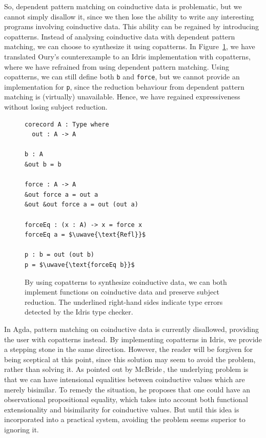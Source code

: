So, dependent pattern matching on coinductive data is problematic, but we cannot
simply disallow it, since we then lose the ability to write any interesting
programs involving coinductive data. This ability can be regained by introducing
copatterns. Instead of analysing coinductive data with dependent pattern
matching, we can choose to synthesize it using copatterns. In
Figure~\ref{fig:ourys_counterexample_copatterns}, we have translated Oury's
counterexample to an Idris implementation with copatterns, where we have
refrained from using dependent pattern matching. Using copatterns, we can still
define both \texttt{b} and \texttt{force}, but we cannot provide an
implementation for \texttt{p}, since the reduction behaviour from dependent
pattern matching is (virtually) unavailable. Hence, we have regained
expressiveness without losing subject reduction.

\begin{figure}[h]
\begin{lstlisting}[mathescape]
corecord A : Type where
  out : A -> A

b : A
&out b = b

force : A -> A
&out force a = out a
&out &out force a = out (out a)

forceEq : (x : A) -> x = force x
forceEq a = $\uwave{\text{Refl}}$

p : b = out (out b)
p = $\uwave{\text{forceEq b}}$
\end{lstlisting}
  \caption{By using copatterns to synthesize coinductive data, we can both
    implement functions on coinductive data and preserve subject
    reduction. The underlined right-hand sides indicate type errors detected by
    the Idris type checker.}
\label{fig:ourys_counterexample_copatterns}
\end{figure}

In Agda, pattern matching on coinductive data is currently disallowed, providing
the user with copatterns instead. By implementing copatterns in Idris, we
provide a stepping stone in the same direction. However, the reader will be
forgiven for being sceptical at this point, since this solution may seem to
avoid the problem, rather than solving it. As pointed out by
McBride\,\citep{McBride:2009}, the underlying problem is that we can have
intensional equalities between coinductive values which are merely bisimilar. To
remedy the situation, he proposes that one could have an observational
propositional equality, which takes into account both functional extensionality
and bisimilarity for coinductive values. But until this idea is incorporated into a
practical system, avoiding the problem seems superior to ignoring it.


